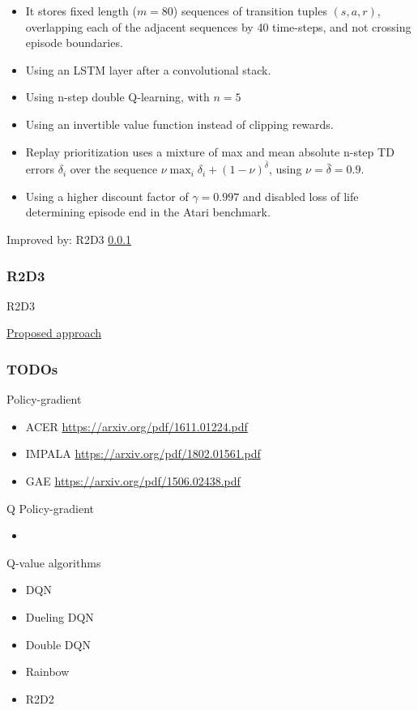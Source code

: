 \documentclass[12pt, english]{article}
\begin{document}
\begin{itemize}
  \item It stores fixed length ($m=80$) sequences of transition tuples $(s,a,r)$, overlapping each of the adjacent sequences by 40 time-steps, and not crossing episode boundaries.
  \item Using an LSTM layer after a convolutional stack.
  \item Using n-step double Q-learning, with $n=5$
  \item Using an invertible value function instead of clipping rewards.
  \item Replay prioritization uses a mixture of max and mean absolute n-step TD errors $\delta_i$ over the sequence $\nu \max_i \delta_i + (1−\nu)^{\bar{\delta}}$, using $\nu=\bar{\delta}=0.9$.
  \item Using a higher discount factor of $\gamma=0.997$ and disabled loss of life determining episode end in the Atari benchmark.
\end{itemize}

Improved by: R2D3 \ref{R2D3}

\subsubsection{R2D3}
\label{R2D3}

R2D3 \cite{paine_making_2019}

\underline{Proposed approach}



\subsubsection{TODOs}

Policy-gradient

\begin{itemize}
  \item ACER \url{https://arxiv.org/pdf/1611.01224.pdf}
  \item IMPALA \url{https://arxiv.org/pdf/1802.01561.pdf}
  \item GAE \url{https://arxiv.org/pdf/1506.02438.pdf}
\end{itemize}

Q Policy-gradient

\begin{itemize}
  \item
\end{itemize}

Q-value algorithms
\begin{itemize}
  \item DQN
  \item Dueling DQN
  \item Double DQN
  \item Rainbow
  \item R2D2
\end{itemize}
\end{document}
